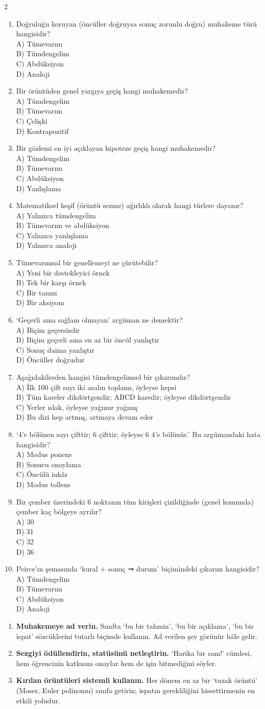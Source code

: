 \begin{multicols}{2}
\footnotesize
\raggedcolumns
\newcommand{\cs}[5]{\item #1\\[1pt]
\hspace*{0.4em}A) #2\\\hspace*{0.4em}B) #3\\\hspace*{0.4em}C) #4\\\hspace*{0.4em}D) #5}
\begin{enumerate}[leftmargin=1.8em,label=\textbf{\arabic*.},itemsep=0.45em]
\cs{Doğruluğu koruyan (öncüller doğruysa sonuç zorunlu doğru) muhakeme türü hangisidir?}{Tümevarım}{Tümdengelim}{Abdüksiyon}{Analoji}
\cs{Bir örüntüden genel yargıya geçiş hangi muhakemedir?}{Tümdengelim}{Tümevarım}{Çelişki}{Kontrapozitif}
\cs{Bir gözlemi en iyi açıklayan hipoteze geçiş hangi muhakemedir?}{Tümdengelim}{Tümevarım}{Abdüksiyon}{Yanlışlama}
\cs{Matematiksel keşif (örüntü sezme) ağırlıklı olarak hangi türlere dayanır?}{Yalnızca tümdengelim}{Tümevarım ve abdüksiyon}{Yalnızca yanlışlama}{Yalnızca analoji}
\cs{Tümevarımsal bir genellemeyi ne çürütebilir?}{Yeni bir destekleyici örnek}{Tek bir karşı örnek}{Bir tanım}{Bir aksiyom}
\cs{‘Geçerli ama sağlam olmayan’ argüman ne demektir?}{Biçim geçersizdir}{Biçim geçerli ama en az bir öncül yanlıştır}{Sonuç daima yanlıştır}{Öncüller doğrudur}
\cs{Aşağıdakilerden hangisi tümdengelimsel bir çıkarımdır?}{İlk 100 çift sayı iki asalın toplamı, öyleyse hepsi}{Tüm kareler dikdörtgendir; ABCD karedir; öyleyse dikdörtgendir}{Yerler ıslak, öyleyse yağmur yağmış}{Bu dizi hep artmış, artmaya devam eder}
\cs{‘4’e bölünen sayı çifttir; 6 çifttir; öyleyse 6 4’e bölünür.’ Bu argümandaki hata hangisidir?}{Modus ponens}{Sonucu onaylama}{Öncülü inkâr}{Modus tollens}
\cs{Bir çember üzerindeki 6 noktanın tüm kirişleri çizildiğinde (genel konumda) çember kaç bölgeye ayrılır?}{30}{31}{32}{36}
\cs{Peirce’ın şemasında ‘kural + sonuç ⇒ durum’ biçimindeki çıkarım hangisidir?}{Tümdengelim}{Tümevarım}{Abdüksiyon}{Analoji}
\end{enumerate}
\end{multicols}


\begin{enumerate}[leftmargin=1.6em,label=\textbf{\arabic*.}]
\item \textbf{Muhakemeye ad verin.} Sınıfta ‘bu bir tahmin’, ‘bu bir açıklama’, ‘bu bir ispat’ sözcüklerini tutarlı biçimde kullanın. Ad verilen şey görünür hâle gelir.
\item \textbf{Sezgiyi ödüllendirin, statüsünü netleştirin.} ‘Harika bir sanı!’ cümlesi, hem öğrencinin katkısını onaylar hem de işin bitmediğini söyler.
\item \textbf{Kırılan örüntüleri sistemli kullanın.} Her dönem en az bir ‘tuzak örüntü’ (Moser, Euler polinomu) sınıfa getirin; ispatın gerekliliğini hissettirmenin en etkili yoludur.
\end{enumerate}


